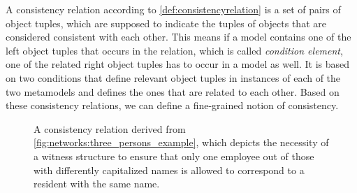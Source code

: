 A consistency relation according to \autoref{def:consistencyrelation} is a set of pairs of object tuples, which are supposed to indicate the tuples of objects that are considered consistent with each other. 
This means if a model contains one of the left object tuples that occurs in the relation, which is called \emph{condition element}, one of the related right object tuples has to occur in a model as well.
It is based on two conditions that define relevant object tuples in instances of each of the two metamodels and defines the ones that are related to each other.
Based on these consistency relations, we can define a fine-grained notion of consistency.


\begin{figure}
    \centering
    
    \caption[Example for necessity of a witness structure]{A consistency relation derived from \autoref{fig:networks:three_persons_example}, which depicts the necessity of a witness structure to ensure that only one employee out of those with differently capitalized names is allowed to correspond to a resident with the same name.}
    \label{fig:correctness:witness_uniqueness}
\end{figure}

